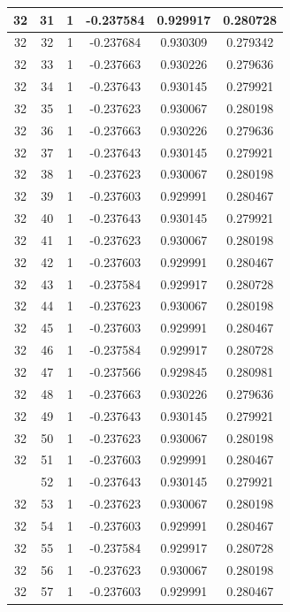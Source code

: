 \documentclass[12pt,a4paper]{article}
\numberwithin{equation}{section}
\numberwithin{figure}{section}
\numberwithin{table}{section}
\begin{document}
\begin{longtable}{|c|c|c|c|c|c|}
32 & 31 & 1 & -0.237584 & 0.929917 & 0.280728 \\ \hline
32 & 32 & 1 & -0.237684 & 0.930309 & 0.279342 \\ \hline
32 & 33 & 1 & -0.237663 & 0.930226 & 0.279636 \\ \hline
32 & 34 & 1 & -0.237643 & 0.930145 & 0.279921 \\ \hline
32 & 35 & 1 & -0.237623 & 0.930067 & 0.280198 \\ \hline
32 & 36 & 1 & -0.237663 & 0.930226 & 0.279636 \\ \hline
32 & 37 & 1 & -0.237643 & 0.930145 & 0.279921 \\ \hline
32 & 38 & 1 & -0.237623 & 0.930067 & 0.280198 \\ \hline
32 & 39 & 1 & -0.237603 & 0.929991 & 0.280467 \\ \hline
32 & 40 & 1 & -0.237643 & 0.930145 & 0.279921 \\ \hline
32 & 41 & 1 & -0.237623 & 0.930067 & 0.280198 \\ \hline
32 & 42 & 1 & -0.237603 & 0.929991 & 0.280467 \\ \hline
32 & 43 & 1 & -0.237584 & 0.929917 & 0.280728 \\ \hline
32 & 44 & 1 & -0.237623 & 0.930067 & 0.280198 \\ \hline
32 & 45 & 1 & -0.237603 & 0.929991 & 0.280467 \\ \hline
32 & 46 & 1 & -0.237584 & 0.929917 & 0.280728 \\ \hline
32 & 47 & 1 & -0.237566 & 0.929845 & 0.280981 \\ \hline
32 & 48 & 1 & -0.237663 & 0.930226 & 0.279636 \\ \hline
32 & 49 & 1 & -0.237643 & 0.930145 & 0.279921 \\ \hline
32 & 50 & 1 & -0.237623 & 0.930067 & 0.280198 \\ \hline
32 & 51 & 1 & -0.237603 & 0.929991 & 0.280467 \\ \hline
\pagebreak
32 & 52 & 1 & -0.237643 & 0.930145 & 0.279921 \\ \hline
32 & 53 & 1 & -0.237623 & 0.930067 & 0.280198 \\ \hline
32 & 54 & 1 & -0.237603 & 0.929991 & 0.280467 \\ \hline
32 & 55 & 1 & -0.237584 & 0.929917 & 0.280728 \\ \hline
32 & 56 & 1 & -0.237623 & 0.930067 & 0.280198 \\ \hline
32 & 57 & 1 & -0.237603 & 0.929991 & 0.280467 \\ \hline

\end{longtable}
\end{document}
